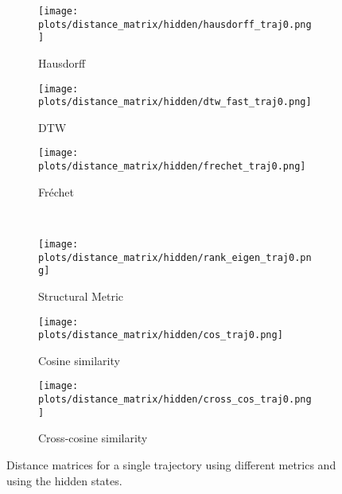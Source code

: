 \documentclass[a4paper,12pt]{article}
\begin{document}
\begin{figure}[H]
    \centering
    \begin{subfigure}[b]{0.32\textwidth}
        \centering
        \texttt{[image: plots/distance\_matrix/hidden/hausdorff\_traj0.png]}
        \caption{Hausdorff}
    \end{subfigure}
    \begin{subfigure}[b]{0.32\textwidth}
        \centering
        \texttt{[image: plots/distance\_matrix/hidden/dtw\_fast\_traj0.png]}
        \caption{DTW}
    \end{subfigure}
    \begin{subfigure}[b]{0.32\textwidth}
        \centering
        \texttt{[image: plots/distance\_matrix/hidden/frechet\_traj0.png]}
        \caption{Fréchet}
    \end{subfigure}
    \\[0.5em]
    \begin{subfigure}[b]{0.32\textwidth}
        \centering
        \texttt{[image: plots/distance\_matrix/hidden/rank\_eigen\_traj0.png]}
        \caption{Structural Metric}
    \end{subfigure}
    \begin{subfigure}[b]{0.32\textwidth}
        \centering
        \texttt{[image: plots/distance\_matrix/hidden/cos\_traj0.png]}
        \caption{Cosine similarity}
    \end{subfigure}
    \begin{subfigure}[b]{0.32\textwidth}
        \centering
        \texttt{[image: plots/distance\_matrix/hidden/cross\_cos\_traj0.png]}
        \caption{Cross-cosine similarity}
    \end{subfigure}
    \caption{Distance matrices for a single trajectory using different metrics and using the hidden states.}
    \label{fig:distance_metrics_comparison_hidden}
\end{figure}
\end{document}
